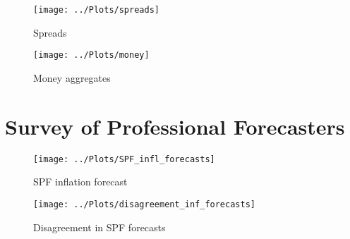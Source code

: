 \documentclass{beamer}
\begin{document}
\begin{frame}
\begin{figure}
	\centering
	\texttt{[image: ../Plots/spreads]}
	\caption{Spreads}
\end{figure}
\end{frame}


\begin{figure}
	\centering
	\texttt{[image: ../Plots/money]}
	\caption{Money aggregates}
\end{figure}


\section{Survey of Professional Forecasters}
\begin{frame}
\begin{figure}
	\centering
	\texttt{[image: ../Plots/SPF\_infl\_forecasts]}
	\caption{SPF inflation forecast}
\end{figure}
\end{frame}


\begin{frame}
\begin{figure}
	\centering
	\texttt{[image: ../Plots/disagreement\_inf\_forecasts]}
	\caption{Disagreement in SPF forecasts}
\end{figure}
\end{frame}
\end{document}
